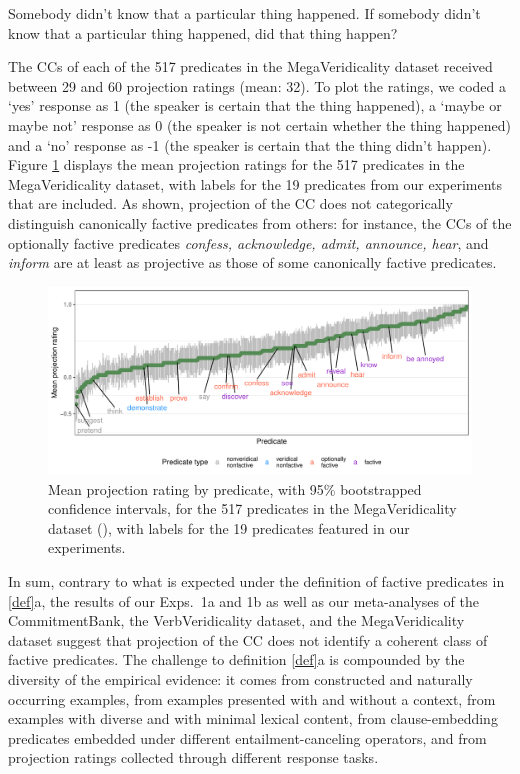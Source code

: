 \documentclass{language}
\newcommand{\6}{\mbox{$[\hspace*{-.6mm}[$}}
\newcommand{\9}{\mbox{$]\hspace*{-.6mm}]$}}
\begin{document}
\begin{exe}
\ex\label{wr-stim-proj}
\begin{xlist}
\ex Somebody didn't know that a particular thing happened.
\ex If somebody didn't know that a particular thing happened, did that thing happen?
\end{xlist}
\end{exe}

The CCs of each of the 517 predicates in the MegaVeridicality dataset received between 29 and 60 projection ratings (mean: 32). To plot the ratings, we coded a `yes' response as 1 (the speaker is certain that the thing happened),  a `maybe or maybe not' response as 0 (the speaker is not certain whether the thing happened) and a `no' response as -1 (the speaker is certain that the thing didn't happen). Figure \ref{f-white-rawlins-projectivity} displays the mean projection ratings for the 517 predicates in the MegaVeridicality dataset, with labels for the 19 predicates from our experiments that are included. As shown, projection of the CC does not categorically distinguish canonically factive predicates from others: for instance, the CCs of the optionally factive predicates {\em confess, acknowledge, admit, announce, hear}, and {\em inform} are at least as projective as those of some canonically factive predicates. 


\begin{figure}[H]
\centering
\includegraphics[width=.77\paperwidth]{Language-figures/color/Figure7.pdf}

\caption{Mean projection rating by predicate, with 95\% bootstrapped confidence intervals, for the 517 predicates in the MegaVeridicality dataset (\citealt{white-rawlins-nels2018,white-etal2018b}), with labels for the 19 predicates featured in our experiments.}
\label{f-white-rawlins-projectivity}
\end{figure}


In sum, contrary to what is expected under the definition of factive predicates in \ref{def}a, the results of our Exps.~1a and 1b as well as our meta-analyses of the CommitmentBank, the VerbVeridicality dataset, and the MegaVeridicality dataset suggest that projection of the CC does not identify a coherent class of factive predicates. The challenge to definition \ref{def}a is compounded by the diversity of the empirical evidence: it comes from constructed and naturally occurring examples, from examples presented with and without a context, from examples with diverse and with minimal lexical content, from clause-embedding predicates embedded under different entailment-canceling operators, and from projection ratings collected through different response tasks. 
\end{document}
